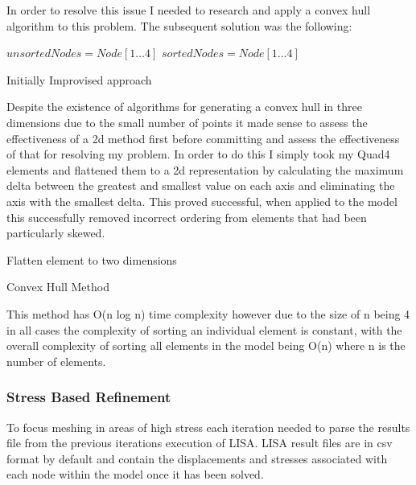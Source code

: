 \documentclass{article}
\begin{document}
\noindent
In order to resolve this issue I needed to research and apply a convex hull algorithm to this problem. The subsequent solution was the following: \\ 

\begin{algorithm}[H]
	
 \State ${unsortedNodes} =  Node[1 \ldots 4]$\;
 \State ${sortedNodes} =  Node[1 \ldots 4]$\;
 
\caption{Initially Improvised approach}
\end{algorithm}

\noindent
Despite the existence of algorithms for generating a convex hull in three dimensions due to the small number of points it made sense to assess the effectiveness of a 2d method first before committing and assess the effectiveness of that for resolving my problem. In order to do this I simply took my Quad4 elements and flattened them to a 2d representation by calculating the maximum delta between the greatest and smallest value on each axis and eliminating the axis with the smallest delta. This proved successful, when applied to the model this successfully removed incorrect ordering from elements that had been particularly skewed. \\ 
	
\begin{algorithm}[H]
 Flatten element to two dimensions\;
\caption{Convex Hull Method}

\end{algorithm}

\noindent
This method has O(n log n) time complexity however due to the size of n being 4 in all cases the complexity of sorting an individual element is constant, with the overall complexity of sorting all elements in the model being O(n) where n is the number of elements.


\subsubsection{Stress Based Refinement}
To focus meshing in areas of high stress each iteration needed to parse the results file from the previous iterations execution of LISA. LISA result files are in csv format by default and contain the displacements and stresses associated with each node within the model once it has been solved.
\end{document}
